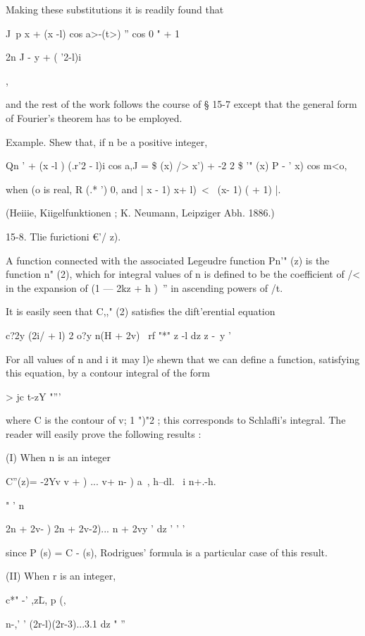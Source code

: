 {{{Making these substitutions it is readily found that 



J\  p  x + (x -l)  cos a>-(t>) '' 
cos 0 " + 1 



2n J -   y + ( '2-l)i 



 , 



and the rest of the work follows the course of § 15-7 except that the general form of 
Fourier's theorem has to be employed. 

Example. Shew that, if n be a positive integer, 

Qn   ' + (x -l )  (.r'2 - l)i cos a,J = \$  (x) />   x') + -2 2 \$ '" (x) P - '   x) cos m<o, 

when (o is real, R (.* ')   0, and |  x - 1)  x+ l)\ < \ (x- 1) (  + 1) |. 

(Heiiie, Kiigelfunktionen ; K. Neumann, Leipziger Abh. 1886.) 

15-8. Tlie furictioni €'/  z). 

A function connected with the associated Legeudre function Pn'" (z) is the function 
 n" (2), which for integral values of n is defined to be the coefficient of /<  in the expansion 
of (1 — 2kz + h )~'' in ascending powers of /t. 

It is easily seen that C,," (2) satisfies the dift'erential equation 

c?2y (2i/ + l) 2 o?y n(H + 2v) \  
rf "*" z -l dz z -\ y ' 

For all values of n and i  it may l)e shewn that we can define a function, satisfying 
this equation, by a contour integral of the form 

  > jc  t-zY  "''' 

where C is the contour of v; 1 ")"2 ; this corresponds to Schlafli's integral. 
The reader will easily prove the following results : 

(I) When n is an integer 

C''(z)=  -2Yv v +  ) ... v+ n- )  a\ , h--dl. \  i n+.-h. 

"  ' n\ \ {2n + 2v- )  2n + 2v-2)... n + 2vy ' dz '  '  ' 

since P  (s) = C  - (s), Rodrigues' formula is a particular case of this result. 

(II) When r is an integer, 

c*" -' ,z\= L,   p (,\ 

n-,'  ' (2r-l)(2r-3)...3.1 dz  "  '' 

}}}}

